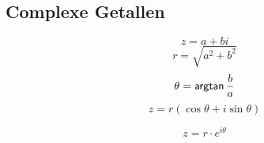 \subsection{Complexe Getallen}
\label{sec:H:ComplexeGetallen}
\[
  z = a + bi
\]
\[
  r = \sqrt{a^2+b^2}
\]
\[
  \theta = \mbox{\textsf{argtan}}\, \frac{b}{a}
\]
\[
  z = r \left( \cos \theta + i\sin \theta \right)
\]

\[
  z = r \cdot e^{i \theta}
\]